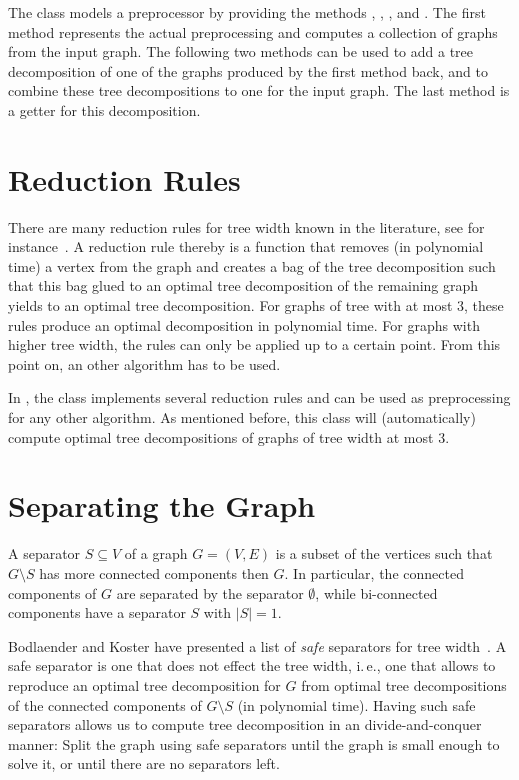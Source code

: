 \documentclass[a4paper, ukenglish, twoside, openright]{jdrasilmanual}
\begin{document}
The class  models a preprocessor by providing the
methods , ,
, and . The
first method represents the actual preprocessing and computes a
collection of graphs from the input graph.  The following two methods
can be used to add a tree decomposition of one of the graphs produced
by the first method back, and to combine these tree decompositions to
one for the input graph. The last method is a getter for this
decomposition.


\section{Reduction Rules}
There are many reduction rules for tree width known in the
literature, see for instance~\cite{DowneyF2013}. A reduction rule thereby is a function that removes (in
polynomial time) a vertex from the graph and creates a bag of the
tree decomposition such that this bag glued to an optimal
tree decomposition of the remaining graph yields to an optimal
tree decomposition. For graphs of tree with at most 3, these rules
produce an optimal decomposition in polynomial time.  For graphs with
higher tree width, the rules can only be applied up to a certain
point. From this point on, an other algorithm has to be used.

In \Jdrasil, the class  implements several
reduction rules and can be used as preprocessing for any other
algorithm. As mentioned before, this class will (automatically)
compute optimal tree decompositions of graphs of tree width at most
$3$. 

\section{Separating the Graph}
A separator $S\subseteq V$ of a graph $G=(V,E)$ is a subset of the
vertices such that $G\setminus S$ has more connected components
then $G$. In particular, the connected components of $G$ are separated
by the separator $\emptyset$, while bi-connected components have a
separator $S$ with $|S|=1$.

Bodlaender and Koster have presented a list of \emph{safe} separators
for tree width~\cite{BodlaenderK2006}. A safe separator is one that
does not effect the tree width, i.\,e., one that allows to reproduce
an optimal tree decomposition for $G$ from optimal tree decompositions
of the connected components of $G\setminus S$ (in polynomial
time). Having such safe separators allows us to compute tree
decomposition in an divide-and-conquer manner: Split the graph using
safe separators until the graph is small enough to solve it, or until
there are no separators left.
\end{document}
